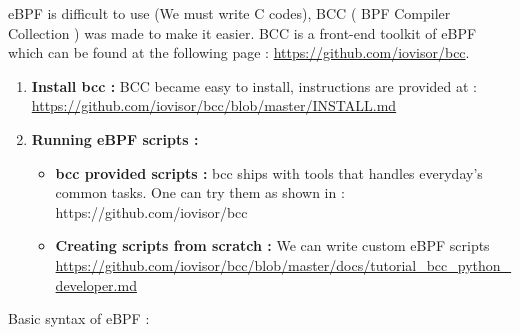 eBPF is difficult to use (We must write C codes), BCC ( BPF Compiler Collection ) was made to make it easier.
BCC is a front-end toolkit of eBPF which can be found at the following page : {\color{blue}\url{https://github.com/iovisor/bcc}}.


\begin{enumerate}
	\item \textbf{Install bcc : } BCC became easy to install, instructions are provided at : {\color{blue}\url{https://github.com/iovisor/bcc/blob/master/INSTALL.md}}
	
	\item \textbf{Running eBPF scripts : } 
		\begin{itemize}
			\item \textbf{bcc provided scripts : } bcc ships with tools that handles everyday's common tasks. One can try them as shown in : {\color{blue}https://github.com/iovisor/bcc}
			
			\item \textbf{Creating scripts from scratch : } We can write custom eBPF scripts {\color{blue}\url{https://github.com/iovisor/bcc/blob/master/docs/tutorial_bcc_python_developer.md}}
						
			
		\end{itemize}			
\end{enumerate}

Basic syntax of eBPF : 

